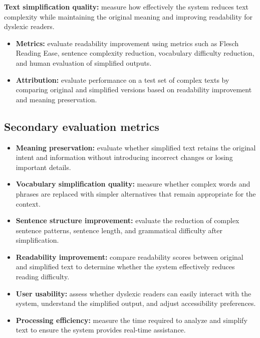 \documentclass[11pt,a4paper]{article}
\begin{document}
\textbf{Text simplification quality:} measure how effectively the system reduces text complexity while maintaining the original meaning and improving readability for dyslexic readers.

\begin{itemize}[leftmargin=0.7cm]

    \item \textbf{Metrics:} evaluate readability improvement using metrics such as Flesch Reading Ease, sentence complexity reduction, vocabulary difficulty reduction, and human evaluation of simplified outputs.

    \item \textbf{Attribution:} evaluate performance on a test set of complex texts by comparing original and simplified versions based on readability improvement and meaning preservation.

\end{itemize}

\subsection{Secondary evaluation metrics}

\begin{itemize}[leftmargin=0.7cm]

    \item \textbf{Meaning preservation:} evaluate whether simplified text retains the original intent and information without introducing incorrect changes or losing important details.

    \item \textbf{Vocabulary simplification quality:} measure whether complex words and phrases are replaced with simpler alternatives that remain appropriate for the context.

    \item \textbf{Sentence structure improvement:} evaluate the reduction of complex sentence patterns, sentence length, and grammatical difficulty after simplification.

    \item \textbf{Readability improvement:} compare readability scores between original and simplified text to determine whether the system effectively reduces reading difficulty.

    \item \textbf{User usability:} assess whether dyslexic readers can easily interact with the system, understand the simplified output, and adjust accessibility preferences.

    \item \textbf{Processing efficiency:} measure the time required to analyze and simplify text to ensure the system provides real-time assistance.

\end{itemize}
\end{document}
